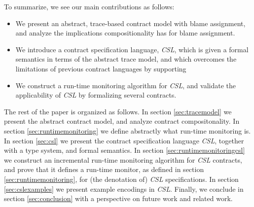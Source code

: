 \documentclass[orivec,final]{llncs-href}
\newcommand{\csl}{\textit{CSL}}
\begin{document}
To summarize, we see our main contributions as follows:
\begin{itemize}
\item We present an abstract, trace-based contract model with
  blame assignment, and analyze the implications compositionality has
  for blame assignment.
\item We introduce a contract specification language, \csl{}, which is
  given a formal semantics in terms of the abstract trace model, and
  which overcomes the limitations of previous contract languages by
  supporting
\item We construct a run-time monitoring algorithm for \csl{}, and
  validate the applicability of \csl{} by formalizing several contracts.
\end{itemize}

The rest of the paper is organized as follows. In section
\ref{sec:tracemodel} we present the abstract contract model, and
analyze contract compositonality. In section
\ref{sec:runtimemonitoring} we define abstractly what run-time
monitoring is. In section \ref{sec:csl} we present the contract
specification language \csl{}, together with a type system, and formal
semantics. In section \ref{sec:runtimemonitoringcsl} we construct an
incremental run-time monitoring algorithm for \csl{} contracts, and
prove that it defines a run-time monitor, as defined in section
\ref{sec:runtimemonitoring}, for (the denotation of) \csl{}
specifications. In section  \ref{sec:cslexamples} we present example
encodings in \csl{}. Finally, we conclude in section
\ref{sec:conclusion} with a perspective on future work and related
work.
\end{document}
